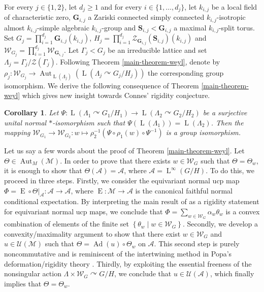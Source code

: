 \documentclass[11pt]{amsart}
\numberwithin{equation}{section}
\theoremstyle{plain}
\newtheorem{lettercor}[letterthm]{Corollary}
\theoremstyle{definition}
\newcommand{\Aut}{\operatorname{Aut}}
\newcommand{\Ad}{\operatorname{Ad}}
\newcommand{\rE}{\operatorname{ E}}
\newcommand{\rL}{\operatorname{ L}}
\begin{document}
For every $j \in \{1, 2\}$, let $d_j \geq 1$ and for every $i \in \{1, \dots, d_j\}$, let $k_{i, j}$ be a local field of characteristic zero, $\mathbf G_{i, j}$ a Zariski connected simply connected $k_{i, j}$-isotropic almost $k_{i, j}$-simple algebraic $k_{i, j}$-group and $\mathbf S_{i, j} < \mathbf G_{i, j}$ a maximal $k_{i, j}$-split torus. Set $G_j = \prod_{i = 1}^{d_j} \mathbf G_{i, j}(k_{i, j})$, $H_j = \prod_{i = 1}^{d_j} \mathscr Z_{\mathbf G_{i, j}}(\mathbf S_{i, j})(k_{i, j})$ and $\mathscr W_{G_j} = \prod_{i = 1}^{d_j} \mathscr W_{\mathbf G_{i, j}}$. Let $\Gamma_j < G_j$ be an irreducible lattice and set $\Lambda_j = \Gamma_j/\mathscr Z(\Gamma_j)$. Following Theorem \ref{main-theorem-weyl}, denote by $\rho_j : \mathscr W_{G_j} \to \Aut_{\rL(\Lambda_j)}(\rL(\Lambda_j \curvearrowright G_j/H_j))$ the corresponding group isomorphism. We derive the following consequence of Theorem \ref{main-theorem-weyl} which gives new insight towards Connes'\! rigidity conjecture. 


\begin{lettercor}\label{main-cor-connes}
Let $\Psi : \rL(\Lambda_1 \curvearrowright G_1/H_1) \to \rL(\Lambda_2 \curvearrowright G_2/H_2)$ be a surjective unital normal $\ast$-isomorphism such that $\Psi(\rL(\Lambda_1)) = \rL(\Lambda_2)$. Then the mapping $\mathscr W_{G_1} \to \mathscr W_{G_2} : w \mapsto \rho_2^{-1}(\Psi \circ \rho_1(w) \circ \Psi^{-1})$ is a group isomorphism.
\end{lettercor}


Let us say a few words about the proof of Theorem \ref{main-theorem-weyl}. Let $\Theta \in \Aut_M(\mathscr M)$. In order to prove that there exists $w \in \mathscr W_G$ such that $\Theta = \Theta_w$, it is enough to show that $\Theta(\mathscr A) = \mathscr A$, where $\mathscr A = \rL^\infty(G/H)$. To do this, we proceed in three steps. Firstly, we consider the equivariant normal ucp map $\Phi = \rE \circ \Theta|_{\mathscr A} : \mathscr A \to \mathscr A$, where $\rE : \mathscr M \to \mathscr A$ is the canonical faithful normal conditional expectation. By interpreting the main result of \cite{BFGW12} as a rigidity statement for equivariant normal ucp maps, we conclude that $\Phi = \sum_{w \in \mathscr W_G} \alpha_w \theta_w$ is a convex combination of
elements of the finite set $\left \{ \theta_w \mid w \in \mathscr W_G\right \}$. Secondly, we develop a convexity/maximality argument to show that there exist $w \in \mathscr W_G$ and $u \in \mathscr U(\mathscr M)$ such that $\Theta = \Ad(u) \circ \Theta_w$ on $\mathscr A$. This second step is purely noncommutative and is reminiscent of the intertwining method in Popa's deformation/rigidity theory \cite{Po06}. Thirdly, by exploiting the essential freeness of the nonsingular action $\Lambda \times \mathscr W_G \curvearrowright G/H$, we conclude that $u \in \mathscr U(\mathscr A)$, which finally implies that $\Theta = \Theta_w$.
\end{document}
